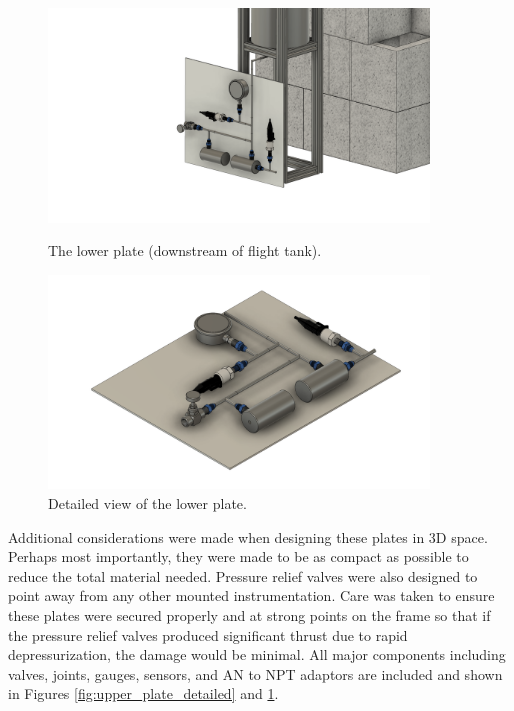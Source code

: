 \documentclass[9pt]{article} %
\numberwithin{equation}{section} %
\begin{document}
\begin{figure}
    \centering
    \begin{minipage}{0.49\textwidth}
        \centering
        \includegraphics[scale=0.5, width=0.9\textwidth, trim={5cm 0cm 5cm 0cm}, clip]{system_cad_files/master_lower_plate.png} %
        \caption{The lower plate (downstream of flight tank).}
        \label{fig:lower_plate}
    \end{minipage}\hfill
    \begin{minipage}{0.49\textwidth}
        \centering
        \includegraphics[scale=0.5, width=0.9\textwidth, trim={5cm 0cm 5cm 0cm}, clip]{system_cad_files/master_post_tank_board_v6.png} %
        \caption{Detailed view of the lower plate.}
        \label{fig:lower_plate_detailed}
    \end{minipage}
\end{figure} 

Additional considerations were made when designing these plates in 3D space. Perhaps most importantly, they were made to be as compact as possible to reduce the total material needed. Pressure relief valves were also designed to point away from any other mounted instrumentation. Care was taken to ensure these plates were secured properly and at strong points on the frame so that if the pressure relief valves produced significant thrust due to rapid depressurization, the damage would be minimal. All major components including valves, joints, gauges, sensors, and AN to NPT adaptors are included and shown in Figures \ref{fig:upper_plate_detailed} and \ref{fig:lower_plate_detailed}.
\end{document}
